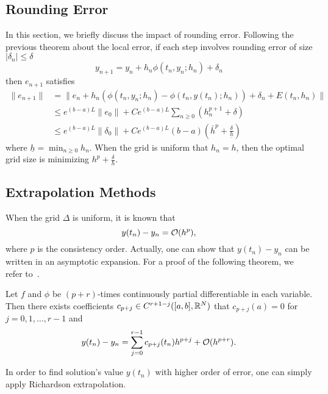 \subsection{Rounding Error}
In this section, we briefly discuss the impact of rounding error. 
Following the previous theorem about the local error, if each step involves rounding error of size $|\delta_n|\le \delta$ 
\begin{equation}
    y_{n+1} = y_n + h_n \phi(t_n, y_n; h_n) + \delta_n 
\end{equation}
then $e_{n+1}$ satisfies 
\begin{equation}
    \begin{aligned}
        \|e_{n+1}\| & = \|e_n + h_n(\phi(t_n, y_n;h_n) - \phi(t_n, y(t_n); h_n)) + \delta_n + E(t_n, h_n)  \|  \\
        &\le  e^{(b-a)L} \|e_0\| + C e^{(b-a)L} \sum_{n\ge 0}(h_n^{p+1} +\delta) \\
        &\le e^{(b-a)L} \|\delta_0\| + C e^{(b-a)L}  (b-a) \left( \bar{h}^p + \frac{\delta}{\underline{h}}\right)
    \end{aligned}
\end{equation}
where $\underline{h} = \min_{n\ge 0} h_n$. When the grid is uniform that $h_n = h$, then the optimal grid size is minimizing $h^p + \frac{\delta}{h}$.
\subsection{Extrapolation Methods}
When the grid $\Delta$ is uniform, it is known that 
$$y(t_n) - y_n = \mathcal O(h^p),$$
where $p$ is the consistency order. Actually, one can show that $y(t_n) - y_n$ can be written in an asymptotic expansion. For a proof of the following theorem, we refer to~\cite{gragg1965extrapolation}.
\begin{theorem}
    Let $f$ and $\phi$ be $(p+r)$-times continuously partial differentiable in each variable. Then there exists coefficients $c_{p+j}\in C^{r+1- j}([a, b],\mathbb R^N)$ that $c_{p+j}(a) = 0$ for $j=0,1,\dots, r-1$ and 
    \begin{equation}
        y(t_n) - y_n = \sum_{j=0}^{r-1} c_{p+j}(t_n) h^{p+j} + \mathcal O(h^{p+r}).
    \end{equation}
\end{theorem}
In order to find solution's value $y(t_n)$ with higher order of error, one can simply apply Richardson extrapolation.
